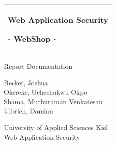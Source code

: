 
%
\begin{titlepage}
  \addtolength{\hoffset}{0.5\evensidemargin-0.5\oddsidemargin} 
  \noindent%
  \begin{tabular}{@{}p{\textwidth}@{}}
    \toprule[2pt]
    \midrule
    \vspace{0.2cm}
    \begin{center}
    \Huge{\textbf{
      Web Application Security
    }}
    \end{center}
    \begin{center}
      \Large{
        - WebShop -
      }
    \end{center}
    \vspace{0.2cm}\\
    \midrule
    \toprule[2pt]
  \end{tabular}
  \vspace{4 cm}
  \begin{center}
    {\Large
      Report Documentation
    }\\
    \vspace{0.4cm}
    {\Large
      
      Becker, Joshua \\
      \vspace{0.2cm}
      Okereke, Uchechukwu Okpo \\
      \vspace{0.2cm}
      Shama, Muthuraman Venkatesan \\
      \vspace{0.2cm}
      Ulbrich, Damian \\
    }
  \end{center}
  \vfill
  \begin{center}
  University of Applied Sciences Kiel\\
  Web Application Security
  \end{center}
\end{titlepage}
\clearpage